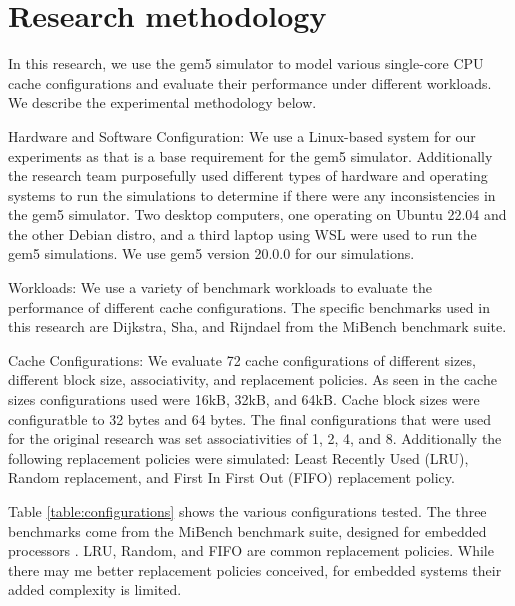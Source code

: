 \documentclass[conference]{IEEEtran}
\begin{document}
\section{Research methodology}
In this research, we use the gem5 simulator to model various single-core CPU cache configurations and evaluate their performance under different workloads. We describe the experimental methodology below.

Hardware and Software Configuration:
We use a Linux-based system for our experiments as that is a base requirement for the gem5 simulator. Additionally the research team purposefully used different types of hardware and operating systems to run the simulations to determine if there were any inconsistencies in the gem5 simulator. Two desktop computers, one operating on Ubuntu 22.04 and the other Debian distro, and a third laptop using WSL were used to run the gem5 simulations. We use gem5 version 20.0.0 for our simulations.

Workloads:
We use a variety of benchmark workloads to evaluate the performance of different cache configurations. The specific benchmarks used in this research are Dijkstra, Sha, and Rijndael from the MiBench benchmark suite.

Cache Configurations:
We evaluate 72 cache configurations of different sizes, different block size, associativity, and replacement policies. As seen in the cache sizes configurations used were 16kB, 32kB, and 64kB. Cache block sizes were configuratble to 32 bytes and 64 bytes. The final configurations that were used for the original research was set associativities of 1, 2, 4, and 8. Additionally the following replacement policies were simulated: Least Recently Used (LRU), Random replacement, and First In First Out (FIFO) replacement policy.

Table \ref{table:configurations} shows the various configurations tested. The three benchmarks come from the MiBench benchmark suite, designed for embedded processors \cite{990739}. LRU, Random, and FIFO are common replacement policies. While there may me better replacement policies conceived, for embedded systems their added complexity is limited.
\end{document}
